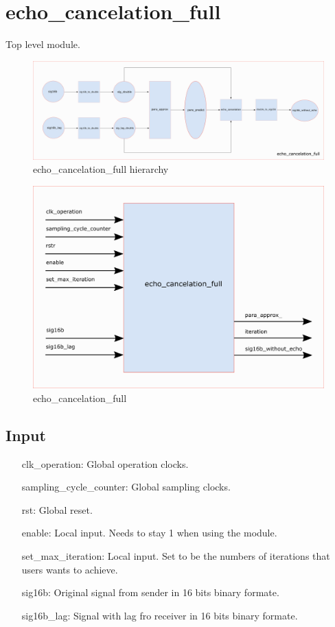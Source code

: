 \documentclass[twoside,a4paper]{refart}
\begin{document}
\section{echo\_cancelation\_full}
Top level module. 
\begin{figure}[H]
	\centering
	\includegraphics[scale=0.7]{echo_cancelation_full.png}
	\caption{echo\_cancelation\_full hierarchy}
	\label{}
\end{figure}
\begin{figure}[H]
	\centering
	\includegraphics[scale=1.2]{echo_cancelation_full_module.png}
	\caption{echo\_cancelation\_full}
	\label{}
\end{figure}
\subsection{Input}
\begin{itemize}
		\item[clk\_operation:] Global operation clocks.
		\item[sampling\_cycle\_counter:] Global sampling clocks.
		\item[rst:      ] Global reset.
		\item[enable:] Local input. Needs to stay 1 when using the module.
		\item[set\_max\_iteration:] Local input. Set to be the numbers of iterations that users wants to achieve.
		\item[sig16b:] Original signal from sender in 16 bits binary formate.
		\item[sig16b\_lag:] Signal with lag fro receiver in 16 bits binary formate.
\end{itemize}
\end{document}

